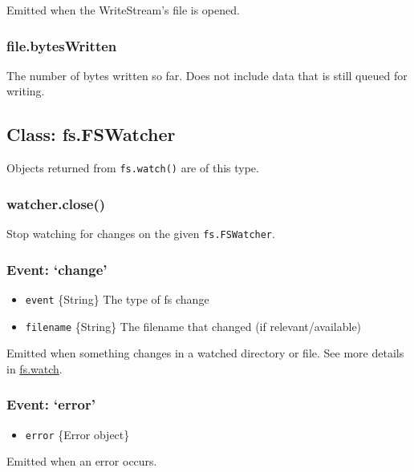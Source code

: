Emitted when the WriteStream's file is opened.

\subsubsection{file.bytesWritten}

The number of bytes written so far. Does not include data that is still
queued for writing.

\subsection{Class: fs.FSWatcher}

Objects returned from \texttt{fs.watch()} are of this type.

\subsubsection{watcher.close()}

Stop watching for changes on the given \texttt{fs.FSWatcher}.

\subsubsection{Event: `change'}

\begin{itemize}
\item
  \texttt{event} \{String\} The type of fs change
\item
  \texttt{filename} \{String\} The filename that changed (if
  relevant/available)
\end{itemize}

Emitted when something changes in a watched directory or file. See more
details in
\hyperref[fs_fs_watch_filename_options_listener]{fs.watch}.

\subsubsection{Event: `error'}

\begin{itemize}
\item
  \texttt{error} \{Error object\}
\end{itemize}

Emitted when an error occurs.
